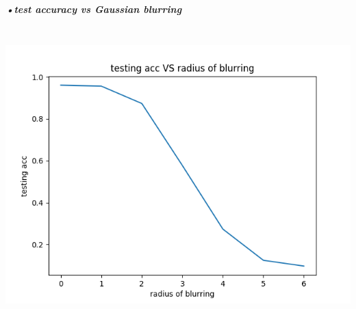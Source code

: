 \documentclass[11pt]{article} %
\begin{document}
\subparagraph{•test accuracy vs Gaussian blurring}\mbox{}\\
\includegraphics[scale=0.7]{e141blur.png}
\end{document}
